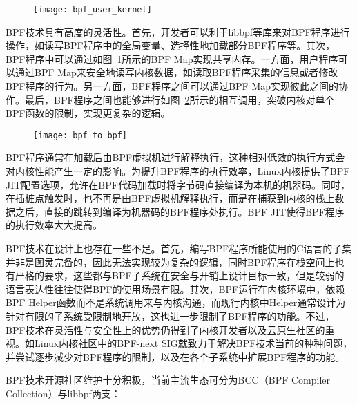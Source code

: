 \begin{figure}[!htbp]
    \centering
    \texttt{[image: bpf\_user\_kernel]}
    \label{fig:bpf_user_kernel}
\end{figure}

BPF技术具有高度的灵活性。首先，开发者可以利于libbpf等库来对BPF程序进行操作，如读写BPF程序中的全局变量、选择性地加载部分BPF程序等。其次，BPF程序中可以通过如图~\ref{fig:bpf_user_kernel}所示的BPF Map实现共享内存。一方面，用户程序可以通过BPF Map来安全地读写内核数据，如读取BPF程序采集的信息或者修改BPF程序的行为。另一方面，BPF程序之间可以通过BPF Map实现彼此之间的协作。最后，BPF程序之间也能够进行如图~\ref{fig:bpf_to_bpf}所示的相互调用，突破内核对单个BPF函数的限制，实现更复杂的逻辑。

\begin{figure}[!htbp]
    \centering
    \texttt{[image: bpf\_to\_bpf]}
    \label{fig:bpf_to_bpf}
\end{figure}

BPF程序通常在加载后由BPF虚拟机进行解释执行，这种相对低效的执行方式会对内核性能产生一定的影响。为提升BPF程序的执行效率，Linux内核提供了BPF JIT配置选项，允许在BPF代码加载时将字节码直接编译为本机的机器码。同时，在插桩点触发时，也不再是由BPF虚拟机解释执行，而是在捕获到内核的栈上数据之后，直接的跳转到编译为机器码的BPF程序处执行。BPF JIT使得BPF程序的执行效率大大提高。

BPF技术在设计上也存在一些不足。首先，编写BPF程序所能使用的C语言的子集并非是图灵完备的，因此无法实现较为复杂的逻辑，同时BPF程序在栈空间上也有严格的要求，这些都与BPF子系统在安全与开销上设计目标一致，但是较弱的语言表达性往往使得BPF的使用场景有限。其次，BPF运行在内核环境中，依赖BPF Helper函数而不是系统调用来与内核沟通，而现行内核中Helper通常设计为针对有限的子系统受限制地开放，这也进一步限制了BPF程序的功能。不过，BPF技术在灵活性与安全性上的优势仍得到了内核开发者以及云原生社区的重视。如Linux内核社区中的BPF-next SIG就致力于解决BPF技术当前的种种问题，并尝试逐步减少对BPF程序的限制，以及在各个子系统中扩展BPF程序的功能。

BPF技术开源社区维护十分积极，当前主流生态可分为BCC（BPF Compiler Collection）\citep{bcc}与libbpf\citep{libbpf}两支：


